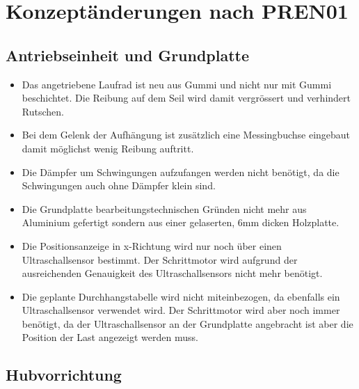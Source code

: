 \documentclass[a4paper]{report}
\begin{document}
\section{Konzeptänderungen nach PREN01}
\label{sec:Konzeptaenderungen}

\subsection{Antriebseinheit und Grundplatte}

\begin{itemize}
		\item Das angetriebene Laufrad ist neu aus Gummi und nicht nur mit Gummi beschichtet. Die Reibung auf dem Seil wird damit vergrössert und verhindert Rutschen.
		\item Bei dem Gelenk der Aufhängung ist zusätzlich eine Messingbuchse eingebaut damit möglichst wenig Reibung auftritt.
		\item Die Dämpfer um Schwingungen aufzufangen werden nicht benötigt, da die Schwingungen auch ohne Dämpfer klein sind.
		\item Die Grundplatte bearbeitungstechnischen Gründen nicht mehr aus Aluminium gefertigt sondern aus einer gelaserten, 6mm dicken Holzplatte.
		\item Die Positionsanzeige in x-Richtung wird nur noch über einen Ultraschallsensor bestimmt. Der Schrittmotor wird aufgrund der ausreichenden Genauigkeit des Ultraschallsensors nicht mehr benötigt.
		\item Die geplante Durchhangstabelle wird nicht miteinbezogen, da ebenfalls ein Ultraschallsensor verwendet wird. Der Schrittmotor wird aber noch immer benötigt, da der Ultraschallsensor an der Grundplatte angebracht ist aber die Position der Last angezeigt werden muss.
\end{itemize}

\subsection{Hubvorrichtung}
\end{document}
